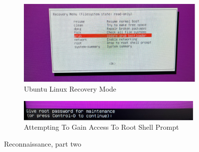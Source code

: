 \documentclass[manuscript,acmsmall,anonymous,review,screen,nonacm=true, authorversion=true]{acmart}
\begin{document}
\begin{figure}
    \centering
   \begin{subfigure}{.45\textwidth}
    \begin{centering}
    \includegraphics[scale=0.5]{pict/Picture5.png}
    \caption{Ubuntu Linux Recovery Mode}
    \end{centering}
\end{subfigure}
\begin{subfigure}{.5\textwidth}
    \begin{centering}
    \includegraphics[scale=0.5]{pict/Picture6.png}
    \caption{Attempting To Gain Access To Root Shell Prompt}
    \end{centering}
\end{subfigure}
\caption{Reconnaissance, part two}
    \label{fig:2}
\end{figure}
\end{document}
